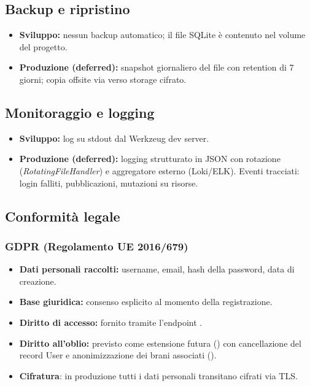 \subsection{Backup e ripristino}
\begin{itemize}
    \item \textbf{Sviluppo:} nessun backup automatico; il file SQLite è
    contenuto nel volume del progetto.
    \item \textbf{Produzione (deferred):} snapshot giornaliero del file
     con retention di 7 giorni; copia offsite via
     verso storage cifrato.
\end{itemize}

\subsection{Monitoraggio e logging}
\begin{itemize}
    \item \textbf{Sviluppo:} log su stdout dal Werkzeug dev server.
    \item \textbf{Produzione (deferred):} logging strutturato in JSON con
    rotazione (\emph{RotatingFileHandler}) e aggregatore esterno
    (Loki/ELK). Eventi tracciati: login falliti, pubblicazioni, mutazioni
    su risorse.
\end{itemize}

\subsection{Conformità legale}
\subsubsection{GDPR (Regolamento UE 2016/679)}
\begin{itemize}
    \item \textbf{Dati personali raccolti:} username, email, hash della
    password, data di creazione.
    \item \textbf{Base giuridica:} consenso esplicito al momento della
    registrazione.
    \item \textbf{Diritto di accesso:} fornito tramite l'endpoint
    .
    \item \textbf{Diritto all'oblio:} previsto come estensione futura
    () con cancellazione del record User e
    anonimizzazione dei brani associati ().
    \item \textbf{Cifratura}: in produzione tutti i dati personali
    transitano cifrati via TLS.
\end{itemize}

